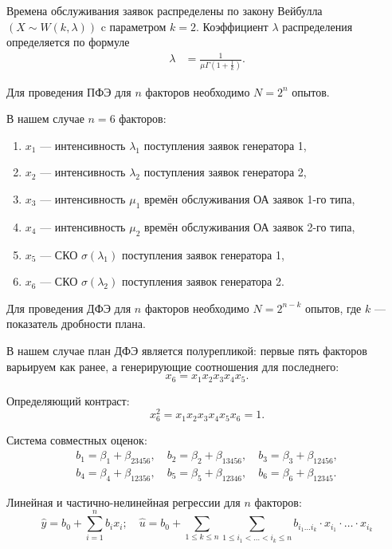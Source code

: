 \documentclass[a4paper, 14pt]{extreport}
\begin{document}
\begin{MainPart}
Времена обслуживания заявок распределены по закону Вейбулла $(X \sim W(k, \lambda))$ c параметром $k = 2$.
Коэффициент $\lambda$ распределения определяется по формуле
\begin{equation}
	\begin{aligned}
		\lambda &= \frac{1}{\mu\Gamma{\left(1 + \frac1k\right)}}.
	\end{aligned}
\end{equation}

Для проведения ПФЭ для $n$ факторов необходимо $N = 2^n$ опытов.

В нашем случае $n = 6$ факторов:
\begin{enumerate}
	\item $x_1$ — интенсивность $\lambda_1$ поступления заявок генератора 1,
	\item $x_2$ — интенсивность $\lambda_2$ поступления заявок генератора 2,
	\item $x_3$ — интенсивность $\mu_1$ времён обслуживания ОА заявок 1-го типа,
	\item $x_4$ — интенсивность $\mu_2$ времён обслуживания ОА заявок 2-го типа,
	\item $x_5$ — СКО $\sigma(\lambda_1)$ поступления заявок генератора 1,
	\item $x_6$ — СКО $\sigma(\lambda_2)$ поступления заявок генератора 2.
\end{enumerate}

Для проведения ДФЭ для $n$ факторов необходимо $N = 2^{n - k}$ опытов, где $k$ — показатель дробности плана.

В нашем случае план ДФЭ является полурепликой: первые пять факторов варьируем как ранее, а генерирующие соотношения для последнего:
\begin{equation}
	x_6 = x_1x_2x_3x_4x_5.
\end{equation}

Определяющий контраст:
\begin{equation}
	x_6^2 = x_1x_2x_3x_4x_5x_6 = 1.
\end{equation}

Система совместных оценок:
\begin{gather*}
	b_1 = \beta_1 + \beta_{23456}, \quad
	b_2 = \beta_2 + \beta_{13456}, \quad
	b_3 = \beta_3 + \beta_{12456}, \\
	b_4 = \beta_4 + \beta_{12356}, \quad
	b_5 = \beta_5 + \beta_{12346}, \quad
	b_6 = \beta_6 + \beta_{12345}.
\end{gather*}

Линейная и частично-нелинейная регрессии для $n$ факторов:
\begin{equation}
	\hat y = b_0 + \sum_{i = 1}^{n}b_ix_i; \quad \hat u = b_0 + \sum_{1 \leqslant k \leqslant n}\sum_{1 \leqslant i_1 < \ldots < i_k \leqslant n}b_{i_1\ldots i_k}\cdot x_{i_1} \cdot \ldots \cdot x_{i_k}
\end{equation}


\end{MainPart}
\end{document}

